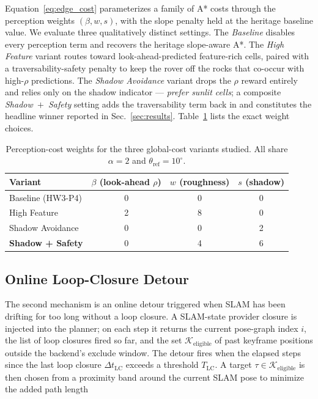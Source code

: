 \documentclass[letterpaper,times]{IONconf}
\begin{document}
Equation~\eqref{eq:edge_cost} parameterizes a family of A* costs through the perception weights $(\beta, w, s)$, with the slope penalty held at the heritage baseline value. We evaluate three qualitatively distinct settings. The \emph{Baseline} disables every perception term and recovers the heritage slope-aware A*. The \emph{High Feature} variant routes toward look-ahead-predicted feature-rich cells, paired with a traversability-safety penalty to keep the rover off the rocks that co-occur with high-$\rho$ predictions. The \emph{Shadow Avoidance} variant drops the $\rho$ reward entirely and relies only on the shadow indicator --- \emph{prefer sunlit cells}; a composite \emph{Shadow~$+$~Safety} setting adds the traversability term back in and constitutes the headline winner reported in Sec.~\ref{sec:results}. Table~\ref{tab:variants} lists the exact weight choices.

\begin{table}[t]
\renewcommand{\arraystretch}{1.2}
\caption{Perception-cost weights for the three global-cost variants studied. All share $\alpha = 2$ and $\theta_{\text{ref}} = 10^\circ$.}
\label{tab:variants}
\centering
\begin{tabular}{lccc}
\toprule
Variant & $\beta$ (look-ahead $\rho$) & $w$ (roughness) & $s$ (shadow) \\
\midrule
Baseline (HW3-P4)        & 0 & 0 & 0 \\
High Feature             & 2 & 8 & 0 \\
Shadow Avoidance         & 0 & 0 & 2 \\
\textbf{Shadow + Safety} & 0 & 4 & 6 \\
\bottomrule
\end{tabular}
\end{table}

\subsection{Online Loop-Closure Detour}
\label{sec:detour}

The second mechanism is an online detour triggered when SLAM has been drifting for too long without a loop closure. A SLAM-state provider closure is injected into the planner; on each step it returns the current pose-graph index $i$, the list of loop closures fired so far, and the set $\mathcal{K}_{\text{eligible}}$ of past keyframe positions outside the backend's exclude window. The detour fires when the elapsed steps since the last loop closure $\Delta t_{\text{LC}}$ exceeds a threshold $T_{\text{LC}}$. A target $\tau \in \mathcal{K}_{\text{eligible}}$ is then chosen from a proximity band around the current SLAM pose to minimize the added path length
\end{document}
